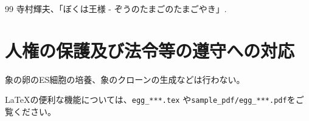 \documentclass[11pt,a4j,dvipdfmx]{jarticle} 					%
\newcommand{\研究課題名}{象の卵}
\newcommand{\研究機関名}{逢坂大学}
\newcommand{\研究代表者氏名}{湯川秀樹}
\newcommand{\研究期間の最終元号年度}{9}  %
\begin{document}
	\vspace{1cm}
	\begin{thebibliography}{99}
		 寺村輝夫、「ぼくは王様 - ぞうのたまごのたまごやき」.
	\end{thebibliography}




\section{人権の保護及び法令等の遵守への対応}

	象の卵のES細胞の培養、象のクローンの生成などは行わない。

	\LaTeX の便利な機能については、\texttt{egg\_***.tex} や\texttt{sample\_pdf/egg\_***.pdf}をご覧ください。








\end{document}
